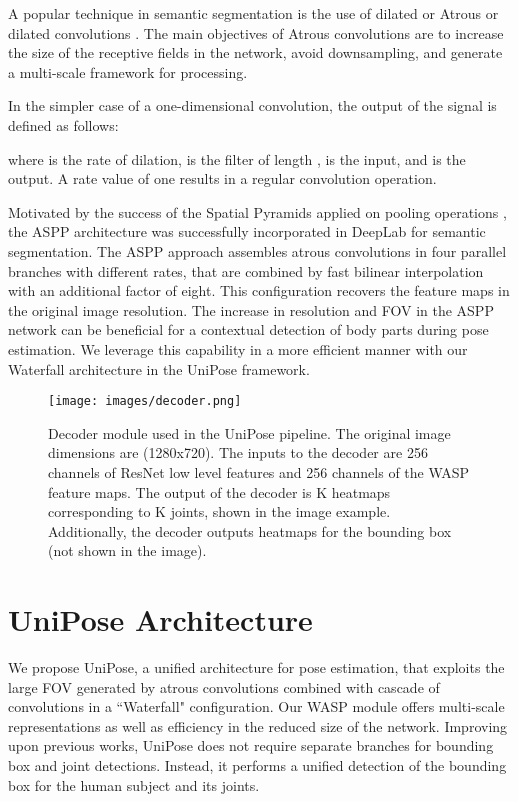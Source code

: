 \documentclass[10pt,twocolumn,letterpaper]{article}
\begin{document}
A popular technique in semantic segmentation is the use of dilated or Atrous or dilated convolutions \cite{DeepLab}. The main objectives of Atrous convolutions are to increase the size of the receptive fields in the network, avoid downsampling, and generate a multi-scale framework for processing. 






In the simpler case of a one-dimensional convolution, the output of the signal is defined as follows:

\noindent 
where  is the rate of dilation,  is the filter of length ,  is the input, and  is the output. A rate value of one results in a regular convolution operation.

Motivated by the success of the Spatial Pyramids applied on pooling operations \cite{SPP}, the ASPP architecture was successfully incorporated in DeepLab \cite{DeepLab} for semantic segmentation.
The ASPP approach assembles atrous convolutions in four parallel branches with different rates, that are combined by fast bilinear interpolation with an additional factor of eight. This configuration recovers the feature maps in the original image resolution.
The increase in resolution and FOV in the ASPP network can be beneficial for a contextual detection of body parts during pose estimation. We leverage this capability in a more efficient manner with our Waterfall architecture in the UniPose framework.

\begin{figure*}[th]
\centering
\texttt{[image: images/decoder.png]}
\caption{Decoder module used in the UniPose pipeline. The original image dimensions are (1280x720). The inputs to the decoder are 256 channels of ResNet low level features and 256 channels of the WASP feature maps. The output of the decoder is K heatmaps corresponding to K joints, shown in the image example. Additionally, the decoder outputs heatmaps for the bounding box (not shown in the image). }
\label{fig:decoder}
\end{figure*}

\section{UniPose Architecture}
We propose UniPose, a unified architecture for pose estimation, that exploits the large FOV generated by atrous convolutions combined with cascade of convolutions in a ``Waterfall" configuration. 
Our WASP module 
offers multi-scale representations as well as efficiency in the reduced size of the network. 
Improving upon previous works,  UniPose does not require separate branches for bounding box and joint detections. 
Instead, it performs a unified detection of the bounding box for the human subject and its joints.
\end{document}
